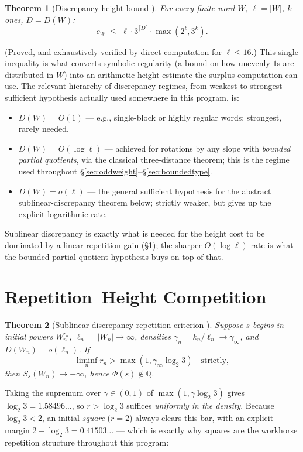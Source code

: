 \documentclass[11pt]{article}
\newtheorem{theorem}{Theorem}[section]
\newcommand{\Q}{\mathbb{Q}}
\begin{document}
\begin{theorem}[Discrepancy-height bound \cite{Phase1Discrepancy}]
For every finite word $W$, $\ell=|W|$, $k$ ones, $D=D(W)$:
\[
c_W \;\le\; \ell\cdot 3^{\lceil D\rceil}\cdot\max(2^\ell,3^k).
\]
\end{theorem}
(Proved, and exhaustively verified by direct computation for $\ell\le 16$.) This single inequality is what converts symbolic regularity (a bound on how unevenly $1$s are distributed in $W$) into an arithmetic height estimate the surplus computation can use. The relevant hierarchy of discrepancy regimes, from weakest to strongest sufficient hypothesis actually used somewhere in this program, is:
\begin{itemize}
\item $D(W)=O(1)$ --- e.g., single-block or highly regular words; strongest, rarely needed.
\item $D(W)=O(\log \ell)$ --- achieved for rotations by any slope with \emph{bounded partial quotients}, via the classical three-distance theorem; this is the regime used throughout \S\ref{sec:oddweight}--\S\ref{sec:boundedtype}.
\item $D(W)=o(\ell)$ --- the general sufficient hypothesis for the abstract sublinear-discrepancy theorem below; strictly weaker, but gives up the explicit logarithmic rate.
\end{itemize}
Sublinear discrepancy is exactly what is needed for the height cost to be dominated by a linear repetition gain (\S\ref{sec:repheight}); the sharper $O(\log\ell)$ rate is what the bounded-partial-quotient hypothesis buys on top of that.

\section{Repetition--Height Competition}
\label{sec:repheight}

\begin{theorem}[Sublinear-discrepancy repetition criterion \cite{Phase1Discrepancy}]
Suppose $s$ begins in initial powers $W_n^{r_n}$, $\ell_n=|W_n|\to\infty$, densities $\gamma_n=k_n/\ell_n\to\gamma_\infty$, and $D(W_n)=o(\ell_n)$. If
\[
\liminf_n r_n > \max(1,\gamma_\infty\log_2 3) \quad\text{strictly},
\]
then $S_s(W_n)\to+\infty$, hence $\Phi(s)\notin\Q$.
\end{theorem}
Taking the supremum over $\gamma\in(0,1)$ of $\max(1,\gamma\log_2 3)$ gives $\log_2 3=1.58496\ldots$, so $r>\log_2 3$ suffices \emph{uniformly in the density}. Because $\log_2 3<2$, an initial \emph{square} ($r=2$) always clears this bar, with an explicit margin $2-\log_2 3=0.41503\ldots$ --- which is exactly why squares are the workhorse repetition structure throughout this program:
\end{document}
